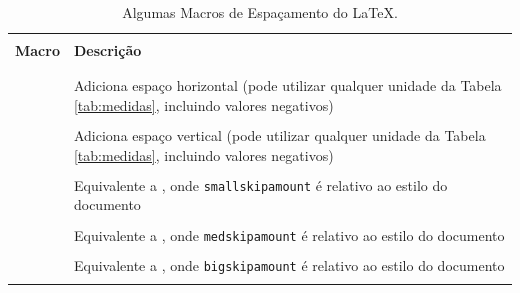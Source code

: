 \begin{table}[H]
\centering
\caption{Algumas Macros de Espaçamento do \LaTeX{}.}
\label{tab:espacamentos}
    \begin{tabular}{p{5cm}p{8cm}}
    \hline
    \\[-0.5em]
    \textbf{Macro} & \textbf{Descrição} \\
    \\[-0.5em]
    \hline
    \hline
    \\[-0.5em]
    \texttt{\hspace}          & Adiciona espaço horizontal (pode utilizar qualquer unidade da Tabela \ref{tab:medidas}, incluindo valores negativos) \\
    \\[-0.5em]
    \texttt{\vspace}          & Adiciona espaço vertical (pode utilizar qualquer unidade da Tabela \ref{tab:medidas}, incluindo valores negativos)\\
    \\[-0.5em]
    \texttt{\smallskip}       & Equivalente a \texttt{\vspace{smallskipamount}}, onde {\tt smallskipamount} é relativo ao estilo do documento \\
    \\[-0.5em]
    \texttt{\medskip}         & Equivalente a \texttt{\vspace{medskipamount}}, onde {\tt medskipamount} é relativo ao estilo do documento \\
    \\[-0.5em]
    \texttt{\bigskip}         & Equivalente a \texttt{\vspace{bigskipamount}}, onde {\tt bigskipamount} é relativo ao estilo do documento \\
    \\[-0.5em]
    \hline
    \end{tabular}
\end{table}


%

